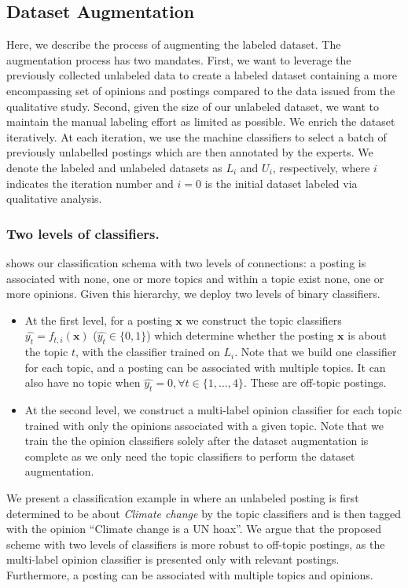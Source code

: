 



\subsection{Dataset Augmentation}
\label{subsec:dataset-augmentation}

Here, we describe the process of augmenting the labeled dataset.
The augmentation process has two mandates.
First, we want to leverage the previously collected unlabeled data to create a labeled dataset containing a more encompassing set of opinions and postings compared to the data issued from the qualitative study.
Second, given the size of our unlabeled dataset, we want to maintain the manual labeling effort as limited as possible.
We enrich the dataset iteratively.
At each iteration, we use the machine classifiers to select a batch of previously unlabelled postings which are then annotated by the experts.
We denote the labeled and unlabeled datasets as $L_i$ and $U_i$, respectively, where $i$ indicates the iteration number and $i=0$ is the initial dataset labeled via qualitative analysis.


\subsubsection{Two levels of classifiers.}
 shows our classification schema with two levels of connections:
a posting is associated with none, one or more topics and within a topic exist none, one or more opinions.
Given this hierarchy, we deploy two levels of binary classifiers.
\begin{itemize}
    \item At the first level, for a posting
          $\pmb{x}$ we construct the topic classifiers $\hat{y_t}=f_{t,i}(\pmb{x})$ ($\hat{y_t} \in \{0, 1\}$) which determine whether the posting $\pmb{x}$ is about the topic $t$, with the classifier trained on $L_i$.
          Note that we build one classifier for each topic, and a posting can be associated with multiple topics.
          It can also have no topic when $\hat{y_t} = 0, \forall t \in \{1,\dots,4\}$.
          These are off-topic postings.
    \item At the second level, we construct a multi-label opinion classifier for each topic trained with only the opinions associated with a given topic.
    Note that we train the the opinion classifiers solely after the dataset augmentation is complete as we only need the topic classifiers to perform the dataset augmentation.
\end{itemize}
We present a classification example in  where an unlabeled posting is first determined to be about \textit{Climate change} by the topic classifiers and is then tagged with the opinion ``Climate change is a UN hoax''.
We argue that the proposed scheme with two levels of classifiers is more robust to off-topic postings, as the multi-label opinion classifier is presented only with relevant postings.
Furthermore, a posting can be associated with multiple topics and opinions.

